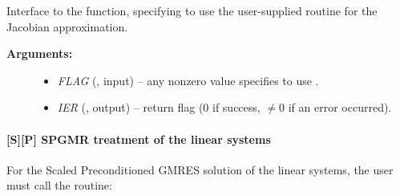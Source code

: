 \documentclass[letterpaper,10pt,english]{sphinxmanual}
\begin{document}
\begin{fulllineitems}
\label{f_interface/Usage:f/_/FARKBANDSETJAC}
Interface to the  function, specifying
to use the user-supplied routine {\hyperref[f_interface/Usage:f/_/FARKBJAC]{}} for the
Jacobian approximation.
\begin{description}
\item[{\textbf{Arguments:}}] \leavevmode\begin{itemize}
\item {} 
\emph{FLAG} (, input) -- any nonzero value specifies to use
{\hyperref[f_interface/Usage:f/_/FARKBJAC]{}}.

\item {} 
\emph{IER} (, output) -- return flag (0 if success,
$\ne 0$ if an error occurred).

\end{itemize}

\end{description}

\end{fulllineitems}



\paragraph{{[}\textbf{S}{]}{[}\textbf{P}{]} SPGMR treatment of the linear systems}
\label{f_interface/Usage:s-p-spgmr-treatment-of-the-linear-systems}
For the Scaled Preconditioned GMRES solution of the linear systems,
the user must call the {\hyperref[f_interface/Usage:f/_/FARKSPGMR]{}} routine:
\end{document}

